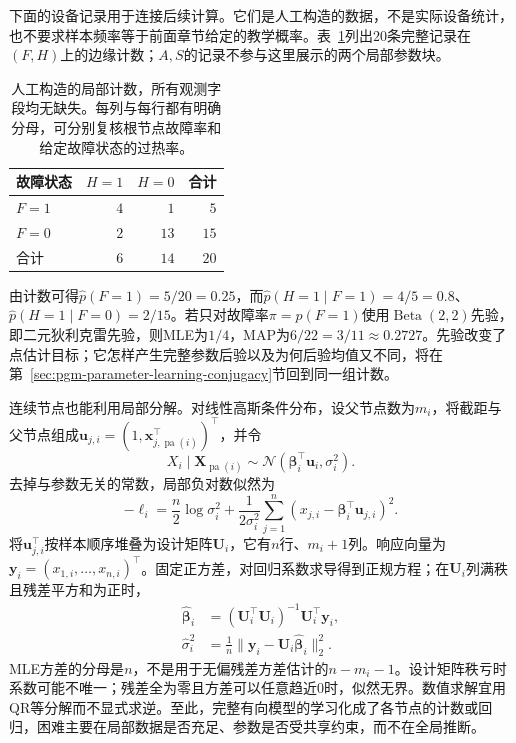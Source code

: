 下面的设备记录用于连接后续计算。它们是人工构造的数据，不是实际设备统计，也不要求样本频率等于前面章节给定的教学概率。表~\ref{tab:pgm-parameter-learning-device-counts}列出$20$条完整记录在$(F,H)$上的边缘计数；$A,S$的记录不参与这里展示的两个局部参数块。

\begin{table}[htbp]
  \centering
  \begin{tabular}{lrrr}
    \toprule
    故障状态 & $H=1$ & $H=0$ & 合计\\
    \midrule
    $F=1$ & $4$ & $1$ & $5$\\
    $F=0$ & $2$ & $13$ & $15$\\
    \midrule
    合计 & $6$ & $14$ & $20$\\
    \bottomrule
  \end{tabular}
  \caption{人工构造的局部计数，所有观测字段均无缺失。每列与每行都有明确分母，可分别复核根节点故障率和给定故障状态的过热率。}
  \label{tab:pgm-parameter-learning-device-counts}
\end{table}

由计数可得$\widehat p(F=1)=5/20=0.25$，而$\widehat p(H=1\mid F=1)=4/5=0.8$、$\widehat p(H=1\mid F=0)=2/15$。若只对故障率$\pi=p(F=1)$使用$\operatorname{Beta}(2,2)$先验，即二元狄利克雷先验，则MLE为$1/4$，MAP为$6/22=3/11\approx0.2727$。先验改变了点估计目标；它怎样产生完整参数后验以及为何后验均值又不同，将在第~\ref{sec:pgm-parameter-learning-conjugacy}节回到同一组计数。

连续节点也能利用局部分解。对线性高斯条件分布，设父节点数为$m_i$，将截距与父节点组成$\bm{u}_{j,i}=(1,\bm{x}_{j,\operatorname{pa}(i)}^\top)^\top$，并令
\[
  X_i\mid\bm{X}_{\operatorname{pa}(i)}
  \sim\mathcal{N}(\bm{\beta}_i^\top\bm{u}_i,\sigma_i^2).
\]
去掉与参数无关的常数，局部负对数似然为
\[
  -\ell_i
  =\frac{n}{2}\log\sigma_i^2+
    \frac{1}{2\sigma_i^2}
      \sum_{j=1}^n(x_{j,i}-\bm{\beta}_i^\top\bm{u}_{j,i})^2.
\]
将$\bm{u}_{j,i}^\top$按样本顺序堆叠为设计矩阵$\bm{U}_i$，它有$n$行、$m_i+1$列。响应向量为$\bm{y}_i=(x_{1,i},\ldots,x_{n,i})^\top$。固定正方差，对回归系数求导得到正规方程；在$\bm{U}_i$列满秩且残差平方和为正时，
\begin{equation}
  \begin{aligned}
    \widehat{\bm{\beta}}_i
      &=(\bm{U}_i^\top\bm{U}_i)^{-1}\bm{U}_i^\top\bm{y}_i,\\
    \widehat{\sigma}_i^2
      &=\frac{1}{n}
        \lVert\bm{y}_i-\bm{U}_i\widehat{\bm{\beta}}_i\rVert_2^2.
  \end{aligned}
  \label{eq:pgm-parameter-learning-gaussian-mle}
\end{equation}
MLE方差的分母是$n$，不是用于无偏残差方差估计的$n-m_i-1$。设计矩阵秩亏时系数可能不唯一；残差全为零且方差可以任意趋近$0$时，似然无界。数值求解宜用QR等分解而不显式求逆。至此，完整有向模型的学习化成了各节点的计数或回归，困难主要在局部数据是否充足、参数是否受共享约束，而不在全局推断。

